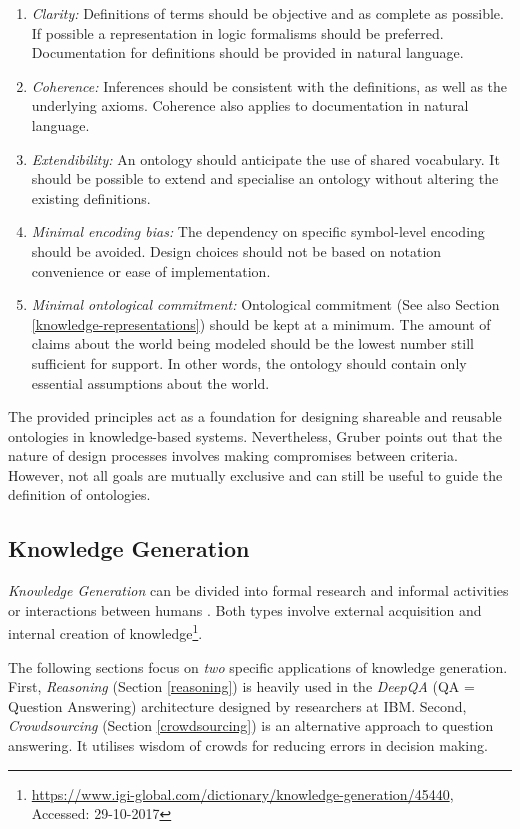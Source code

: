\begin{enumerate}
\item \textit{Clarity:} Definitions of terms should be objective and as complete as possible. If possible a representation in logic formalisms should be preferred. Documentation for definitions should be provided in natural language.
\item \textit{Coherence:} Inferences should be consistent with the definitions, as well as the underlying axioms. Coherence also applies to documentation in natural language.
\item \textit{Extendibility:} An ontology should anticipate the use of shared vocabulary. It should be possible to extend and specialise an ontology without altering the existing definitions.
\item \textit{Minimal encoding bias:} The dependency on specific symbol-level encoding should be avoided. Design choices should not be based on notation convenience or ease of implementation.
\item \textit{Minimal ontological commitment:} Ontological commitment (See also Section \ref{knowledge-representations}) should be kept at a minimum. The amount of claims about the world being modeled should be the lowest number still sufficient for support. In other words, the ontology should contain only essential assumptions about the world.
\end{enumerate}

The provided principles act as a foundation for designing shareable and reusable ontologies in knowledge-based systems.
Nevertheless, Gruber \cite{Gruber1995b} points out that the nature of design processes involves making compromises between criteria.
However, not all goals are mutually exclusive and can still be useful to guide the definition of ontologies.

\subsection{Knowledge Generation}
\textit{Knowledge Generation} can be divided into formal research and informal activities or interactions between humans \cite{NationalResearchCouncil2014a}.
Both types involve external acquisition and internal creation of knowledge\footnote{\url{https://www.igi-global.com/dictionary/knowledge-generation/45440}, Accessed: 29-10-2017}.

The following sections focus on \textit{two} specific applications of knowledge generation.
First, \textit{Reasoning} (Section \ref{reasoning}) is heavily used in the \textit{DeepQA} (QA = Question Answering) architecture designed by researchers at IBM.
Second, \textit{Crowdsourcing} (Section \ref{crowdsourcing}) is an alternative approach to question answering.
It utilises wisdom of crowds for reducing errors in decision making.


